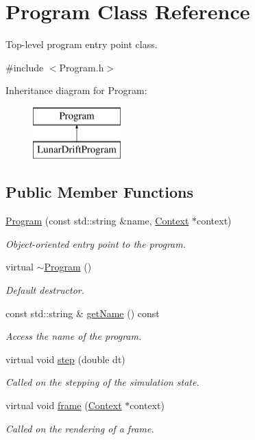 \hypertarget{class_program}{}\section{Program Class Reference}
\label{class_program}


Top-\/level program entry point class.  




{\ttfamily \#include $<$Program.\+h$>$}

Inheritance diagram for Program\+:\begin{figure}[H]
\begin{center}
\leavevmode
\includegraphics[height=2.000000cm]{class_program}
\end{center}
\end{figure}
\subsection*{Public Member Functions}
\begin{DoxyCompactItemize}
\item 
\hyperlink{class_program_a051939fcd1eef21aa8a77f200b15c4ab}{Program} (const std\+::string \&name, \hyperlink{class_context}{Context} $\ast$context)
\begin{DoxyCompactList}\small\item\em Object-\/oriented entry point to the program. \end{DoxyCompactList}\item 
virtual \hyperlink{class_program_a986aef1c50e1d338a3315a47ba6df549}{$\sim$\+Program} ()
\begin{DoxyCompactList}\small\item\em Default destructor. \end{DoxyCompactList}\item 
const std\+::string \& \hyperlink{class_program_a826e23457377f1c8c834f2d2808ceca8}{get\+Name} () const 
\begin{DoxyCompactList}\small\item\em Access the name of the program. \end{DoxyCompactList}\item 
virtual void \hyperlink{class_program_a975de71413195823c525955cfd5f2ca7}{step} (double dt)
\begin{DoxyCompactList}\small\item\em Called on the stepping of the simulation state. \end{DoxyCompactList}\item 
virtual void \hyperlink{class_program_a3b02a58d4c366e280759bc8bbdd4b50d}{frame} (\hyperlink{class_context}{Context} $\ast$context)
\begin{DoxyCompactList}\small\item\em Called on the rendering of a frame. \end{DoxyCompactList}\end{DoxyCompactItemize}
